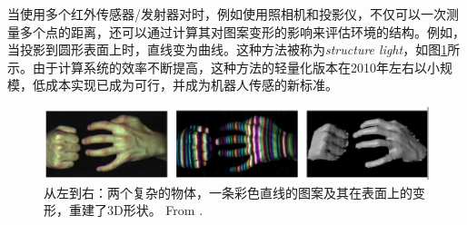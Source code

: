 
当使用多个红外传感器/发射器对时，例如使用照相机和投影仪，不仅可以一次测量多个点的距离，还可以通过计算其对图案变形的影响来评估环境的结构。例如，当投影到圆形表面上时，直线变为曲线。这种方法被称为\emph{structure light}，如图\ref{fig:struclight}所示。由于计算系统的效率不断提高，这种方法的轻量化版本在2010年左右以小规模，低成本实现已成为可行，并成为机器人传感的新标准。

\begin{figure}
	\centering
		\includegraphics[width=\textwidth]{figs/structuredlight.png}
	\caption{从左到右：两个复杂的物体，一条彩色直线的图案及其在表面上的变形，重建了3D形状。 From \protect\cite{zhang2002rapid}.}
	\label{fig:struclight}
\end{figure}


